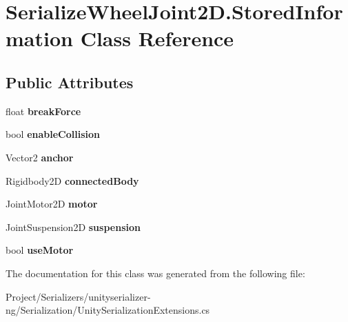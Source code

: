 \hypertarget{class_serialize_wheel_joint2_d_1_1_stored_information}{}\section{Serialize\+Wheel\+Joint2\+D.\+Stored\+Information Class Reference}
\label{class_serialize_wheel_joint2_d_1_1_stored_information}
\subsection*{Public Attributes}
\begin{DoxyCompactItemize}
\item 
\mbox{\label{class_serialize_wheel_joint2_d_1_1_stored_information_a74047ba684f05a51888411a6504f62ff}} 
float {\bfseries break\+Force}
\item 
\mbox{\label{class_serialize_wheel_joint2_d_1_1_stored_information_aa5e7ca53abf20cc2b5f21eb26880d49b}} 
bool {\bfseries enable\+Collision}
\item 
\mbox{\label{class_serialize_wheel_joint2_d_1_1_stored_information_a3e064e6e94be24b60ad7737ad781d32a}} 
Vector2 {\bfseries anchor}
\item 
\mbox{\label{class_serialize_wheel_joint2_d_1_1_stored_information_af7760a3218b5b015873318ce4978a6b1}} 
Rigidbody2D {\bfseries connected\+Body}
\item 
\mbox{\label{class_serialize_wheel_joint2_d_1_1_stored_information_a3446899e56357ddb55bf1baa9851b566}} 
Joint\+Motor2D {\bfseries motor}
\item 
\mbox{\label{class_serialize_wheel_joint2_d_1_1_stored_information_acdba859dd5c255edb6fd7a9ba9e94a7c}} 
Joint\+Suspension2D {\bfseries suspension}
\item 
\mbox{\label{class_serialize_wheel_joint2_d_1_1_stored_information_acef713cbb1ef33d8d37c81534b671468}} 
bool {\bfseries use\+Motor}
\end{DoxyCompactItemize}


The documentation for this class was generated from the following file\+:\begin{DoxyCompactItemize}
\item 
Project/\+Serializers/unityserializer-\/ng/\+Serialization/Unity\+Serialization\+Extensions.\+cs\end{DoxyCompactItemize}
